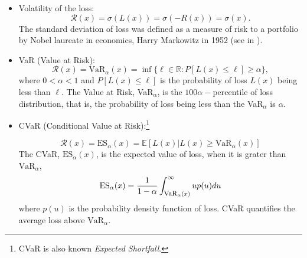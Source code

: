 \begin{itemize}
	\item Volatility of the loss:
	      \[
		      \mathcal{R}(x) = \sigma(L(x)) =\sigma(-R(x)) = \sigma (x).
	      \]
	      The standard deviation of loss was defined as a measure of risk to a portfolio by Nobel laureate in economics, Harry
	      Markowitz in 1952 (see in \cite{Markowitz1952}).

	\item VaR (Value at Risk):
	      \begin{equation}\label{eq:var}
		      \mathcal{R}(x) = \mbox{VaR}_\alpha(x) = \inf\{\ell\in\mathbb{R} : P[L(x)\leq \ell]\geq \alpha \},
	      \end{equation}
	      where $0<\alpha<1$ and $P[L(x)\leq \ell]$ is the probability of loss $L(x)$ being less than $\ell$. The Value at Risk, VaR$_\alpha$, is the $100\alpha-$percentile of loss distribution, that is, the probability of loss being less than the VaR$_\alpha$ is $\alpha$.



	\item CVaR (Conditional Value at Risk):\footnote{CVaR is also known
		      \emph{Expected Shortfall}.}

	      \begin{equation*}
		      \mathcal{R}(x) =\mbox{ES}_\alpha (x) = \mathbb{E}[L(x)|L(x)\geq \mbox{VaR}_\alpha(x)]
	      \end{equation*}
	      The CVaR, $\mbox{ES}_\alpha (x)$, is the expected value of loss, when it is grater than $\mbox{VaR}_\alpha$,
	      \begin{equation}
		      \mbox{ES}_\alpha(x) = \frac{1}{1-\alpha}\int_{\mbox{\footnotesize{VaR}}_\alpha(x)}^\infty u p(u)du
	      \end{equation}
	      where $p(u)$ is the probability density function of loss. CVaR quantifies the average loss above $\mbox{VaR}_\alpha$.

\end{itemize}

